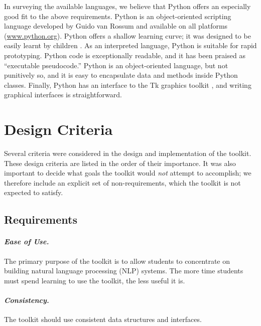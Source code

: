 \documentclass[11pt]{article}
\begin{document}
In surveying the available languages, we believe that Python offers an
especially good fit to the above requirements.  Python is an
object-oriented scripting language developed by Guido van Rossum
and available on all platforms (\url{www.python.org}).  Python offers a
shallow learning curve; it was designed to be easily learnt by
children \cite{rossum99}.  As an interpreted language, Python is
suitable for rapid prototyping.  Python code is exceptionally
readable, and it has been praised as ``executable pseudocode.''
Python is an object-oriented language, but not punitively so, and it
is easy to encapsulate data and methods inside Python classes.
Finally, Python has an interface to the Tk graphics toolkit
\cite{tkinter}, and writing graphical interfaces is straightforward.

\section{Design Criteria}
\label{sec:criteria}

Several criteria were considered in the design and implementation of
the toolkit.  These design criteria are listed in the order of their
importance.  It was also important to decide what goals the toolkit
would \emph{not} attempt to accomplish; we therefore include an
explicit set of non-requirements, which the toolkit is not expected to
satisfy.

\subsection{Requirements}

\paragraph{\textit{Ease of Use.}} The primary purpose of the toolkit is
to allow students to concentrate on building natural language
processing (NLP) systems.  The more time students must spend learning
to use the toolkit, the less useful it is.

\paragraph{\textit{Consistency.}} The toolkit should use consistent data
structures and interfaces.
\end{document}
